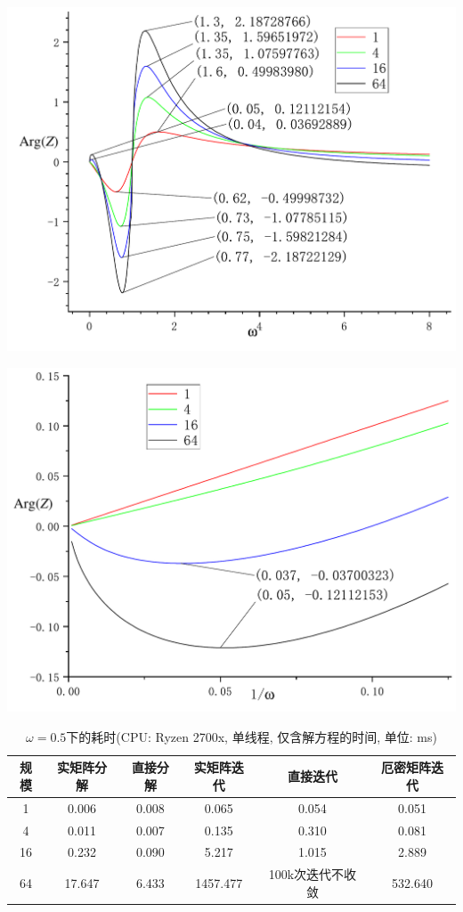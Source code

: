 \documentclass[UTF8]{ctexart}
\begin{document}
            \begin{center}
                \includegraphics[width=14cm]{Arg_1_8.pdf}
            \end{center}
            \begin{center}
                \includegraphics[width=14cm]{Arg_1000_8.pdf}
            \end{center}
            \begin{table}[H]
                \centering
                \caption{$\omega=0.5$下的耗时(CPU: Ryzen 2700x, 单线程, 仅含解方程的时间, 单位: ms)}
                \begin{tabular}{|c|c|c|c|c|c|}
                    \hline
                    规模&实矩阵分解&直接分解&实矩阵迭代&直接迭代&厄密矩阵迭代\\
                    \hline
                    1&0.006&0.008&0.065&0.054&0.051\\
                    \hline
                    4&0.011&0.007&0.135&0.310&0.081\\
                    \hline
                    16&0.232&0.090&5.217&1.015&2.889\\
                    \hline
                    64&17.647&6.433&1457.477&100k次迭代不收敛&532.640\\
                    \hline
                \end{tabular}
            \end{table}
\end{document}
